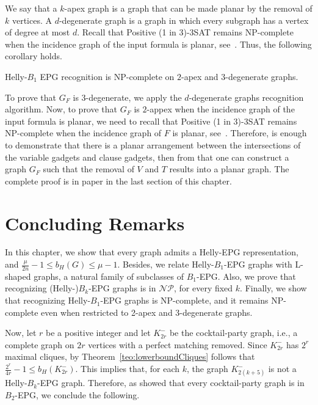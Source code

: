 We say that a $k$-apex graph is a graph that can be made planar by the removal of $k$ vertices. A $d$-degenerate graph is a graph in which every subgraph has a vertex of degree at most $d$. Recall that {\sc Positive (1 in 3)-3SAT} remains NP-complete when the incidence graph of the input formula is planar, see~\cite{mulzer2008minimum}. Thus, the following corollary holds.

\begin{corollary}\label{coro:2apexAnd3degenerate}
{\sc Helly-$B_1$ EPG recognition} is NP-complete on $2$-apex and $3$-degenerate graphs.
\end{corollary}

To prove that $G_F$ is 3-degenerate, we apply the $d$-degenerate graphs recognition algorithm. Now, to prove that $G_F$ is $2$-appex when the incidence graph of the input formula is planar, we need to recall that {\sc Positive (1 in 3)-3SAT} remains NP-complete when the incidence graph of $F$ is planar, see~\cite{mulzer2008minimum}. Therefore, is enough to demonstrate that there is a planar arrangement between the intersections of the variable gadgets and clause gadgets, then from that one can construct a graph $G_F$ such that the removal of $V$ and $T$ results into a planar graph. The complete proof is in paper in the last section of this chapter.


\section{Concluding Remarks}

In this chapter, we show that every graph admits a Helly-EPG representation, and $\frac{\mu}{2n}-1\leq b_H(G)\leq \mu -1$. Besides, we relate Helly-$B_1$-EPG graphs with L-shaped graphs, a natural family of subclasses of $B_1$-EPG. Also, we prove that recognizing (Helly-)$B_k$-EPG graphs is in $\mathcal{NP}$, for every fixed $k$. Finally, we show that recognizing Helly-$B_1$-EPG graphs is NP-complete, and it remains NP-complete even when restricted to 2-apex and 3-degenerate graphs.

Now, let $r$ be a positive integer and let $K_{2r}^-$ be the cocktail-party graph, i.e., a complete graph on $2r$ vertices with a perfect matching removed. Since $K_{2r}^-$ has $2^r$ maximal cliques, by Theorem~\ref{teo:lowerboundCliques} follows that $\frac{2^r}{4r}-1\leq b_H(K_{2r}^-)$. This implies that, for each $k$, the graph $K_{2(k+5)}^-$ is not a Helly-$B_k$-EPG graph. Therefore, as \cite{martin2017} showed that every cocktail-party graph is in $B_2$-EPG, we conclude the following.

